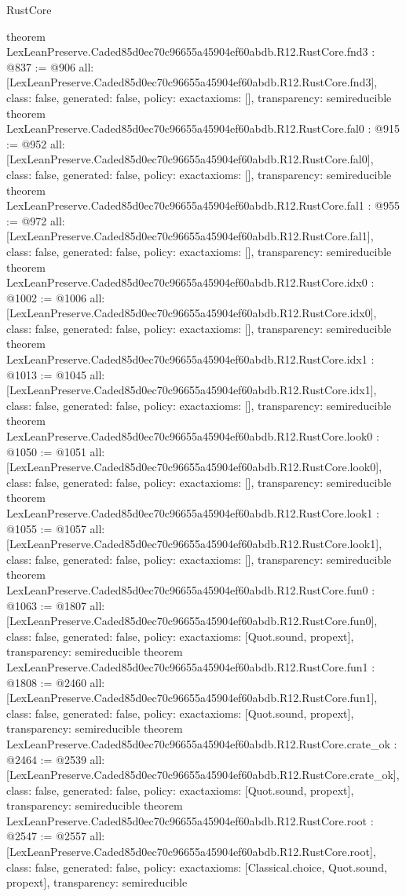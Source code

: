 \begin{lexlean}{RustCore}
\begin{coremodule}
{}
theorem LexLeanPreserve.Caded85d0ec70c96655a45904ef60abdb.R12.RustCore.fnd3 : @837 := @906 {
  all: [LexLeanPreserve.Caded85d0ec70c96655a45904ef60abdb.R12.RustCore.fnd3],
  class: false,
  generated: false,
  policy: exact{axioms: []},
  transparency: semireducible
}
theorem LexLeanPreserve.Caded85d0ec70c96655a45904ef60abdb.R12.RustCore.fal0 : @915 := @952 {
  all: [LexLeanPreserve.Caded85d0ec70c96655a45904ef60abdb.R12.RustCore.fal0],
  class: false,
  generated: false,
  policy: exact{axioms: []},
  transparency: semireducible
}
theorem LexLeanPreserve.Caded85d0ec70c96655a45904ef60abdb.R12.RustCore.fal1 : @955 := @972 {
  all: [LexLeanPreserve.Caded85d0ec70c96655a45904ef60abdb.R12.RustCore.fal1],
  class: false,
  generated: false,
  policy: exact{axioms: []},
  transparency: semireducible
}
theorem LexLeanPreserve.Caded85d0ec70c96655a45904ef60abdb.R12.RustCore.idx0 : @1002 := @1006 {
  all: [LexLeanPreserve.Caded85d0ec70c96655a45904ef60abdb.R12.RustCore.idx0],
  class: false,
  generated: false,
  policy: exact{axioms: []},
  transparency: semireducible
}
theorem LexLeanPreserve.Caded85d0ec70c96655a45904ef60abdb.R12.RustCore.idx1 : @1013 := @1045 {
  all: [LexLeanPreserve.Caded85d0ec70c96655a45904ef60abdb.R12.RustCore.idx1],
  class: false,
  generated: false,
  policy: exact{axioms: []},
  transparency: semireducible
}
theorem LexLeanPreserve.Caded85d0ec70c96655a45904ef60abdb.R12.RustCore.look0 : @1050 := @1051 {
  all: [LexLeanPreserve.Caded85d0ec70c96655a45904ef60abdb.R12.RustCore.look0],
  class: false,
  generated: false,
  policy: exact{axioms: []},
  transparency: semireducible
}
theorem LexLeanPreserve.Caded85d0ec70c96655a45904ef60abdb.R12.RustCore.look1 : @1055 := @1057 {
  all: [LexLeanPreserve.Caded85d0ec70c96655a45904ef60abdb.R12.RustCore.look1],
  class: false,
  generated: false,
  policy: exact{axioms: []},
  transparency: semireducible
}
theorem LexLeanPreserve.Caded85d0ec70c96655a45904ef60abdb.R12.RustCore.fun0 : @1063 := @1807 {
  all: [LexLeanPreserve.Caded85d0ec70c96655a45904ef60abdb.R12.RustCore.fun0],
  class: false,
  generated: false,
  policy: exact{axioms: [Quot.sound, propext]},
  transparency: semireducible
}
theorem LexLeanPreserve.Caded85d0ec70c96655a45904ef60abdb.R12.RustCore.fun1 : @1808 := @2460 {
  all: [LexLeanPreserve.Caded85d0ec70c96655a45904ef60abdb.R12.RustCore.fun1],
  class: false,
  generated: false,
  policy: exact{axioms: [Quot.sound, propext]},
  transparency: semireducible
}
theorem LexLeanPreserve.Caded85d0ec70c96655a45904ef60abdb.R12.RustCore.crate_ok : @2464 := @2539 {
  all: [LexLeanPreserve.Caded85d0ec70c96655a45904ef60abdb.R12.RustCore.crate_ok],
  class: false,
  generated: false,
  policy: exact{axioms: [Quot.sound, propext]},
  transparency: semireducible
}
theorem LexLeanPreserve.Caded85d0ec70c96655a45904ef60abdb.R12.RustCore.root : @2547 := @2557 {
  all: [LexLeanPreserve.Caded85d0ec70c96655a45904ef60abdb.R12.RustCore.root],
  class: false,
  generated: false,
  policy: exact{axioms: [Classical.choice, Quot.sound, propext]},
  transparency: semireducible
}


\end{coremodule}
\end{lexlean}
